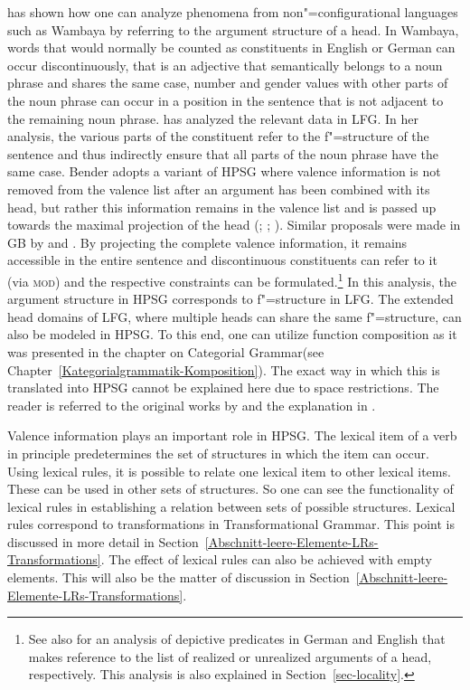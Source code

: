\citet{Bender2008a}\label{Seite-Bender-Wambaya} has shown how one can analyze phenomena from non"=configurational languages such as Wambaya
by referring to the argument structure of a head. In Wambaya, words that would normally be counted as constituents in English or German can occur discontinuously, that
is an adjective that semantically belongs to a noun phrase and shares the same case, number and gender values with other parts of the noun
phrase can occur in a position in the sentence that is not adjacent to the remaining noun phrase. \citet{Nordlinger98a-u} has analyzed the relevant data in LFG\indexlfg. In her analysis, the various parts
of the constituent refer to the f"=structure of the sentence and thus indirectly ensure that all parts of the noun phrase have the same case.
Bender adopts a variant of HPSG where valence information is not removed from the valence list after an argument has been combined with its head, but rather
this information remains in the valence list and is passed up towards the maximal projection of the head (\citealp{Meurers99b}; \citealp{Prze99};
\citealp[Section~17.4]{MuellerLehrbuch1}). Similar proposals were made in GB by \citet[]{Higginbotham85a} and \citet{Winkler97a}. 
By projecting the complete valence information, it remains accessible in the entire sentence and discontinuous constituents can refer to it (\eg via \textsc{mod})
and the respective constraints can be formulated.\footnote{%
	See also  for an analysis of depictive predicates in German and English that makes reference to the list of
	realized or unrealized arguments of a head, respectively. This analysis is also explained in Section~\ref{sec-locality}.
}  
In this analysis, the argument structure in HPSG corresponds to f"=structure in LFG. The extended head domains of LFG\indexlfg, where
multiple heads can share the same f"=structure, can also be modeled in HPSG. To this end, one can utilize function composition
as it was presented in the chapter on Categorial Grammar\indexcg (see Chapter~\ref{Kategorialgrammatik-Komposition}). The exact way in which this is
translated into HPSG cannot be explained here due to space restrictions. The reader is referred to the original works by \citet{HN94a} and the
explanation in .
	
Valence information plays an important role in HPSG. The lexical item of a verb in principle
predetermines the set of structures in which the item can occur.
Using lexical rules, it is possible to relate one lexical item to other lexical items. These can be
used in other sets of structures. So one can see the functionality of lexical rules in establishing
a relation between sets of possible structures. Lexical rules correspond to transformations in Transformational Grammar. This point is discussed in more detail in 
Section~\ref{Abschnitt-leere-Elemente-LRs-Transformations}. The effect of lexical rules can also be achieved with empty elements. This will also be
the matter of discussion in Section~\ref{Abschnitt-leere-Elemente-LRs-Transformations}.

